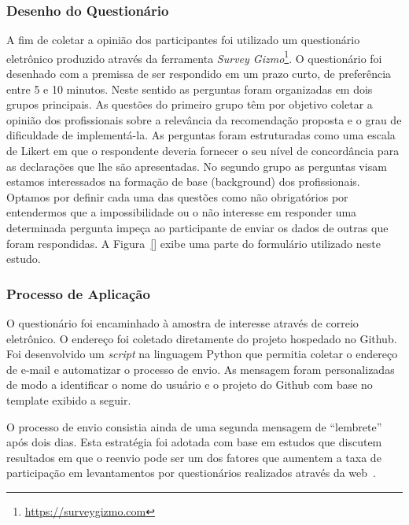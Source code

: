 \subsubsection{Desenho do Questionário}
\label{ssub:sug_melhoria_desenho_questionario}

A fim de coletar a opinião dos participantes foi utilizado um questionário
eletrônico produzido através da ferramenta \textit{Survey
	Gizmo}\footnote{\url{https://surveygizmo.com}}. O questionário foi desenhado
com a premissa de ser respondido em um prazo curto, de preferência entre 5 e 10
minutos. Neste sentido as perguntas foram organizadas em dois grupos principais.
As questões do primeiro grupo têm por objetivo coletar a opinião dos
profissionais sobre a relevância da recomendação proposta e o grau de
dificuldade de implementá-la. As perguntas foram estruturadas como uma escala
de Likert em que o respondente deveria fornecer o seu nível de concordância para
as declarações que lhe são apresentadas. No segundo grupo as perguntas visam
estamos interessados na formação de base (background) dos profissionais. Optamos
por definir cada uma das questões como não obrigatórios por entendermos que a
impossibilidade ou o não interesse em responder uma determinada pergunta impeça
ao participante de enviar os dados de outras que foram respondidas. A
Figura~\ref{} exibe uma parte do formulário utilizado neste estudo.


\subsubsection{Processo de Aplicação}
\label{ssub:processo_de_aplicação}

O questionário foi encaminhado à amostra de interesse através de correio
eletrônico. O endereço foi coletado diretamente do projeto hospedado no Github.
Foi desenvolvido um \textit{script} na linguagem Python que permitia coletar o
endereço de e-mail e automatizar o processo de envio. As mensagem foram
personalizadas de modo a identificar o nome do usuário e o projeto do Github
com base no template exibido a seguir.


O processo de envio consistia ainda de uma segunda mensagem de ``lembrete'' após
dois dias. Esta estratégia foi adotada com base em estudos que discutem
resultados em que o reenvio pode ser um dos fatores que aumentem a taxa de
participação em levantamentos por questionários realizados através da
web~\cite{fan2010factors}.

